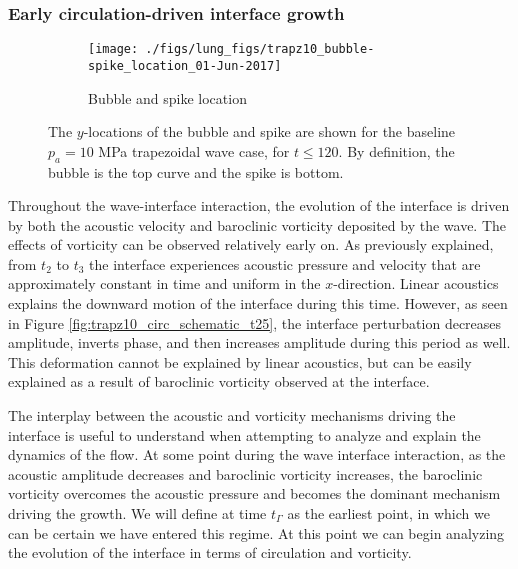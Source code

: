 \documentclass{jfm}%
\begin{document}
\subsubsection{Early circulation-driven interface growth}
\label{subsubsec:tgamma}
\begin{figure}
  \centering
  \captionsetup[subfigure]{labelformat=empty}
  \begin{subfigure}[t]{0.45\textwidth}
    \centering
    \texttt{[image: ./figs/lung\_figs/trapz10\_bubble-spike\_location\_01-Jun-2017]}
    \caption{Bubble and spike location}
  \end{subfigure}
  \caption{The $y$-locations of the bubble and spike are shown for the
    baseline $p_a = 10$ MPa trapezoidal wave case, for $t \leq
    120$. By definition, the bubble is the top curve and the spike is
    bottom.}
  \label{fig:trapz10_bs_location}
\end{figure}
Throughout the wave-interface interaction, the evolution of the
interface is driven by both the acoustic velocity and baroclinic
vorticity deposited by the wave. The effects of vorticity can be
observed relatively early on. As previously explained, from $t_2$ to
$t_3$ the interface experiences acoustic pressure and velocity that
are approximately constant in time and uniform in the
$x$-direction. Linear acoustics explains the downward motion of the
interface during this time. However, as seen in Figure
\ref{fig:trapz10_circ_schematic_t25}, the interface perturbation
decreases amplitude, inverts phase, and then increases amplitude
during this period as well. This deformation cannot be explained by
linear acoustics, but can be easily explained as a result of
baroclinic vorticity observed at the interface.

The interplay between the acoustic and vorticity mechanisms driving
the interface is useful to understand when attempting to analyze and
explain the dynamics of the flow. At some point during the wave
interface interaction, as the acoustic amplitude decreases and
baroclinic vorticity increases, the baroclinic vorticity overcomes the
acoustic pressure and becomes the dominant mechanism driving the
growth. We will define at time $t_\Gamma$ as the earliest point, in
which we can be certain we have entered this regime. At this point we
can begin analyzing the evolution of the interface in terms of
circulation and vorticity.
\end{document}

